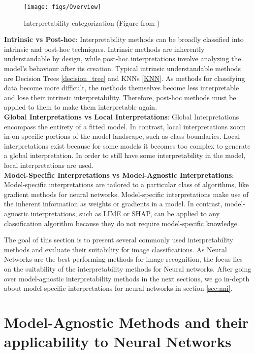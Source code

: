 \begin{figure}[H]
	\centering
	\texttt{[image: figs/Overview]}
	\caption[Interpretability categorization ]{Interpretability categorization (Figure from \cite{allen2023interpretable})}
	\label{fig:IML_Overview}
\end{figure}

\textbf{Intrinsic vs Post-hoc}: Interpretability methods can be broadly classified into intrinsic and post-hoc techniques. Intrinsic methods are inherently understandable by design, while post-hoc interpretations involve analyzing the model's behaviour after its creation. Typical intrinsic understandable methods are Decision Trees \ref{decision_tree} and KNNs \ref{KNN}. As methods for classifying data become more difficult, the methods themselves become less interpretable and lose their intrinsic interpretability. Therefore, post-hoc methods must be applied to them to make them interpretable again.
\\
\textbf{Global Interpretations vs Local Interpretations}: Global Interpretations encompass the entirety of a fitted model. In contrast, local interpretations zoom in on specific portions of the model landscape, such as class boundaries. Local interpretations exist because for some models it becomes too complex to generate a global interpretation. In order to still have some interpretability in the model, local interpretations are used.
\\
\textbf{Model-Specific Interpretations vs Model-Agnostic Interpretations}: 
Model-specific interpretations are tailored to a particular class of algorithms, like gradient methods for neural networks. Model-specific interpretations make use of the inherent information as weights or gradients in a model. In contrast, model-agnostic interpretations, such as LIME or SHAP, can be applied to any classification algorithm because they do not require model-specific knowledge.

The goal of this section is to present several commonly used interpretability methods and evaluate their suitability for image classifications. As Neural Networks are the best-performing methods for image recognition, the focus lies on the suitability of the interpretability methods for Neural networks. After going over model-agnostic interpretability methods in the next sections, we go in-depth about model-specific interpretations for neural networks in section \ref{sec:nni}. 


\section{Model-Agnostic Methods and their applicability to Neural Networks}

